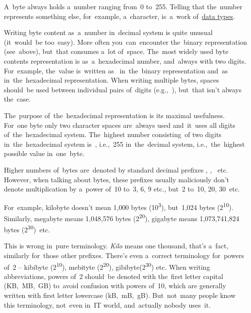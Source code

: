 \enlargethispage{20mm}
\thispagestyle{empty}
A~byte always holds a~number ranging from~0 to~255.
Telling that the~number represents something else, for~example, a~character, is~a~work of~\hyperref[datatypes]{data types}.

Writing byte content as~a~number in~decimal system is quite unusual (it~would~be too~easy).
More often you~can~encounter the~binary representation (see~above), but~that consumes a~lot of~space.
The~most widely used byte contents representation is as~a~hexadecimal number, and~always with two digits.
For~example, the~value  is~written as~ in~the~binary representation and~as~ in~the~hexadecimal representation.
When writing multiple bytes, spaces should~be used between individual pairs of~digits (e.g.,~), but~that isn't always the~case.

The~purpose of~the~hexadecimal representation is its maximal usefulness.
For~one byte only two character spaces are~always used and~it~uses all digits of~the~hexadecimal system.
The~highest number consisting~of two digits in~the~hexadecimal system is~, i.e.,~255 in~the~decimal system, i.e.,~the~highest possible value in~one~byte.
\newpage

\warningnonl Higher numbers of~bytes are~denoted by standard decimal prefixes , , ~etc.
However, when talking about bytes, these prefixes usually maliciously don't denote multiplication by a~power of~10 to~3, 6, 9 etc., but~2 to~10, 20, 30~etc.

For~example, kilobyte doesn't mean 1,000 bytes (10\textsuperscript{3}), but~1,024 bytes (2\textsuperscript{10}).
Similarly, megabyte means 1,048,576 bytes (2\textsuperscript{20}), gigabyte means 1,073,741,824 bytes (2\textsuperscript{30})~etc.

This is wrong in~pure terminology.
\textit{Kilo} means one thousand, that's a~fact, similarly for~those other prefixes.
There's even a~correct terminology for~powers of~2 -- kibibyte (2\textsuperscript{10}), mebityte (2\textsuperscript{20}), gibibyte(2\textsuperscript{30}) etc.
When writing abbreviations, powers of~2 should~be denoted with the~first letter capital (KB,~MB,~GB) to~avoid confusion with powers of~10, which are generally written with first letter lowercase (kB,~mB,~gB).
But~not~many people know this terminology, not~even in~IT world, and~actually nobody uses~it.

